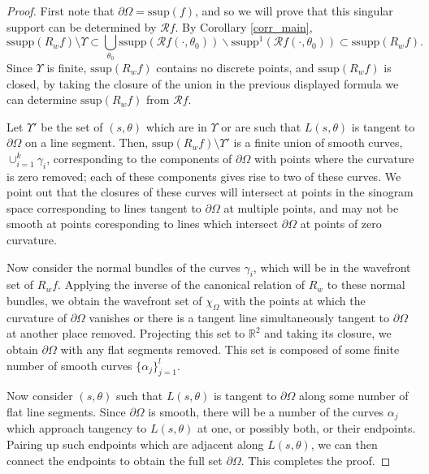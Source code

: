 \documentclass[a4paper,12pt]{amsart}
\numberwithin{equation}{section}
\theoremstyle{plain}
\numberwithin{theorem}{section}
\theoremstyle{definition}
\theoremstyle{remark}
\theoremstyle{remark}
\theoremstyle{remark}
\begin{document}
\begin{proof}
First note that $\partial \Omega = \text{ssup}(f)$, and so we will prove that this singular support can be determined by $\mathcal{R}f$. By Corollary \ref{corr_main},
\[
\text{ssupp}(R_wf) \setminus \Upsilon\subset\bigcup_{\theta_0} \text{ssupp}(\mathcal{R}f(\cdot,\theta_0)) \backslash \text{ssupp}^1(\mathcal{R}f(\cdot,\theta_0)) \subset \text{ssupp}(R_wf).
\]
Since $\Upsilon$ is finite, $\text{ssup}(R_w f)$ contains no discrete points, and $\text{ssup}(R_w f)$ is closed, by taking the closure of the union in the previous displayed formula we can determine $\text{ssup}(R_wf)$ from $\mathcal{R}f$.

Let $\Upsilon'$ be the set of $(s,\theta)$ which are in $\Upsilon$ or are such that $L(s,\theta)$ is tangent to $\partial \Omega$ on a line segment. Then, $\text{ssup}(R_wf)\setminus \Upsilon'$ is a finite union of smooth curves, $\cup_{i=1}^k \gamma_i$, corresponding to the components of $\partial \Omega$ with points where the curvature is zero removed; each of these components gives rise to two of these curves. We point out that the closures of these curves will intersect at points in the sinogram space corresponding to lines tangent to $\partial \Omega$ at multiple points, and may not be smooth at points coresponding to lines which intersect $\partial \Omega$ at points of zero curvature.

Now consider the normal bundles of the curves $\gamma_i$, which will be in the wavefront set of $R_w f$. Applying the inverse of the canonical relation of $R_w$ to these normal bundles, we obtain the wavefront set of $\chi_\Omega$ with the points at which the curvature of $\partial \Omega$ vanishes or there is a tangent line simultaneously tangent to $\partial \Omega$ at another place removed. Projecting this set to $\mathbb{R}^2$ and taking its closure, we obtain $\partial \Omega$ with any flat segments removed. This set is composed of some finite number of smooth curves $\{\alpha_j\}_{j=1}^l$.

Now consider $(s,\theta)$ such that $L(s,\theta)$ is tangent to $\partial \Omega$ along some number of flat line segments. Since $\partial \Omega$ is smooth, there will be a number of the curves $\alpha_j$ which approach tangency to $L(s,\theta)$ at one, or possibly both, or their endpoints. Pairing up such endpoints which are adjacent along $L(s,\theta)$, we can then connect the endpoints to obtain the full set $\partial \Omega$. This completes the proof.



\end{proof}
\end{document}
